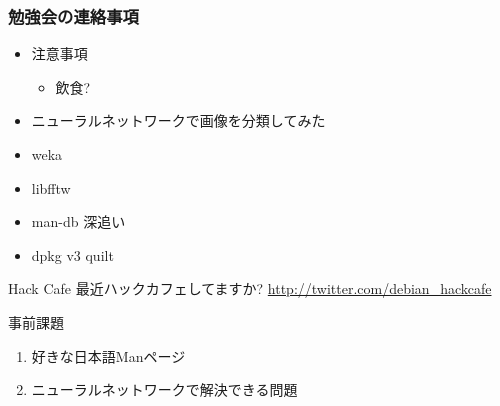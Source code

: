 \frame{\titlepage{}}


\begin{frame}
 \frametitle{勉強会の連絡事項}
\begin{minipage}[t]{0.45\hsize}
  \begin{itemize}
   \item 注意事項
	 \begin{itemize}
	  \item 飲食?
	 \end{itemize}
  \end{itemize}
\end{minipage} 
\begin{minipage}[t]{0.45\hsize}
 \begin{itemize}
  \item ニューラルネットワークで画像を分類してみた
  \item weka
  \item libfftw
  \item man-db 深追い
  \item dpkg v3 quilt
 \end{itemize}
\end{minipage}
\end{frame}

\begin{frame}{Hack Cafe}
 最近ハックカフェしてますか?
 \url{http://twitter.com/debian_hackcafe}\\
\end{frame}


\begin{frame}{事前課題}
\begin{enumerate}
 \item 好きな日本語Manページ
 \item ニューラルネットワークで解決できる問題
\end{enumerate}
\end{frame}

{\footnotesize

}



